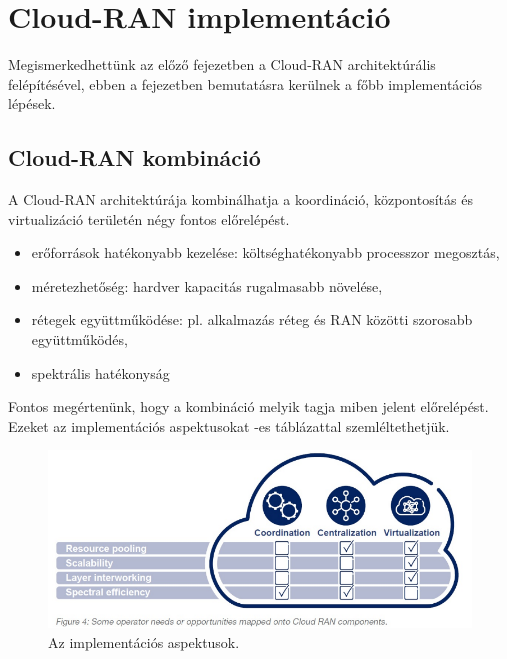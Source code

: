 \chapter{Cloud-RAN implementáció}\label{sect:CloudImp}
Megismerkedhettünk az előző fejezetben a Cloud-RAN architektúrális felépítésével, ebben a fejezetben bemutatásra kerülnek a főbb implementációs lépések.\cite{BenefitsEricsson}
\section{Cloud-RAN kombináció}
\hspace{2mm} 
\indent A Cloud-RAN architektúrája kombinálhatja a koordináció, központosítás és virtualizáció területén négy fontos előrelépést.\cite{FutureCarrier} \cite{WirelessFull}
\begin{itemize}
\item erőforrások hatékonyabb kezelése: költséghatékonyabb processzor megosztás,
\item méretezhetőség: hardver kapacitás rugalmasabb növelése,
\item rétegek együttműködése: pl. alkalmazás réteg és RAN közötti szorosabb együttműködés,
\item spektrális hatékonyság
\end{itemize}
Fontos megértenünk, hogy a kombináció melyik tagja miben jelent előrelépést. Ezeket az implementációs aspektusokat -es táblázattal szemléltethetjük.
\begin{figure}[!ht]
\centering
\includegraphics[width=\textwidth, keepaspectratio]{figures/imp_aspects.png}
\caption{Az implementációs aspektusok.} 
\label{fig:imp_aspects}
\end{figure} 
